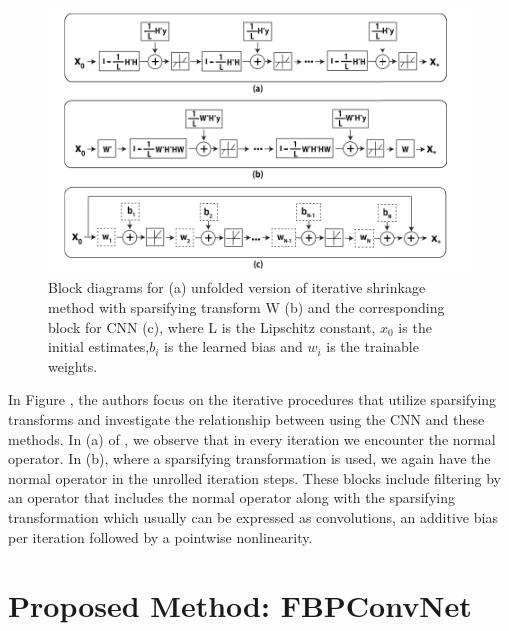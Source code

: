 \documentclass[journal, onecolumn, 11pt]{IEEEtran}
\begin{document}
\begin{figure}[h]
\centering
\includegraphics[width=\textwidth]{images/ISTA_block.png}
\caption{Block diagrams \cite{FBPConvNet} for (a) unfolded version \cite{ISTAnew} of iterative shrinkage method \cite{ISTA} with sparsifying transform W (b) and the corresponding block for CNN (c), where L is the Lipschitz constant, $x_0$ is the initial estimates,$b_i$ is the learned bias and $w_i$ is the trainable weights.}\label{fig:blocks}
\end{figure}

In Figure , the authors focus on the iterative procedures that utilize sparsifying transforms and investigate the relationship between using the CNN and these methods. In (a) of , we observe that in every iteration we encounter the normal operator. In (b), where a sparsifying transformation is used, we again have the normal operator in the unrolled iteration steps. These blocks include filtering by an operator that includes the normal operator along with the sparsifying transformation which usually can be expressed as convolutions, an additive bias per iteration followed by a pointwise nonlinearity.  

\vfill\null\newpage
\section{Proposed Method: FBPConvNet}
\end{document}
